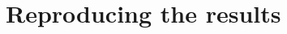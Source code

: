 \documentclass[
fontsize=11pt,
paper=a4,
numbers=noenddot
]{scrartcl}
\begin{document}

\appendix
\section{Reproducing the results}
\end{document}
